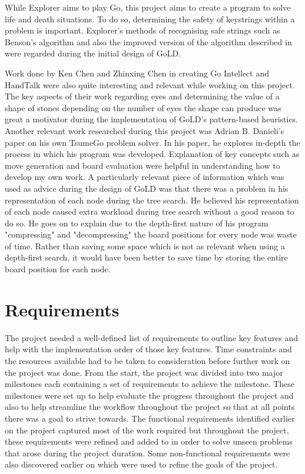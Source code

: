\documentclass{l4proj}
\begin{document}
While Explorer aims to play Go, this project aims to create a program to solve life and death situations. To do so, determining the safety of keystrings within a problem is important. Explorer's methods of recognising safe strings such as Benson's algorithm \cite{Benson1976} and also the improved version of the algorithm described in \cite{Muller1998} were regarded during the initial design of GoLD.

Work done by Ken Chen and Zhinxing Chen \cite{Chen1999} in creating Go Intellect and HandTalk were also quite interesting and relevant while working on this project. The key aspects of their work regarding eyes and determining the value of a shape of stones depending on the number of eyes the shape can produce was great a motivator during the implementation of GoLD's pattern-based heuristics.
Another relevant work researched during this project was Adrian B. Danieli's paper \cite{Adrian2010} on his own TsumeGo problem solver. In his paper, he explores in-depth the process in which his program was developed. Explanation of key concepts such as move generation and board evaluation were helpful in understanding how to develop my own work. A particularly relevant piece of information which was used as advice during the design of GoLD was that there was a problem in his representation of each node during the tree search. He believed his representation of each node caused extra workload during tree search without a good reason to do so. He goes on to explain due to the depth-first nature of his program "compressing" and "decompressing" the board positions for every node was waste of time. Rather than saving some space which is not as relevant when using a depth-first search, it would have been better to save time by storing the entire board position for each node.








\chapter{Requirements}

The project needed a well-defined list of requirements to outline key features and help with the implementation order of those key features. Time constraints and the resources available had to be taken to consideration before further work on the project was done. From the start, the project was divided into two major milestones each containing a set of requirements to achieve the milestone. These milestones were set up to help evaluate the progress throughout the project and also to help streamline the workflow throughout the project so that at all points there was a goal to strive towards. The functional requirements identified earlier on the project captured most of the work required but throughout the project, these requirements were refined and added to in order to solve unseen problems that arose during the project duration. Some non-functional requirements were also discovered earlier on which were used to refine the goals of the project.
\end{document}
